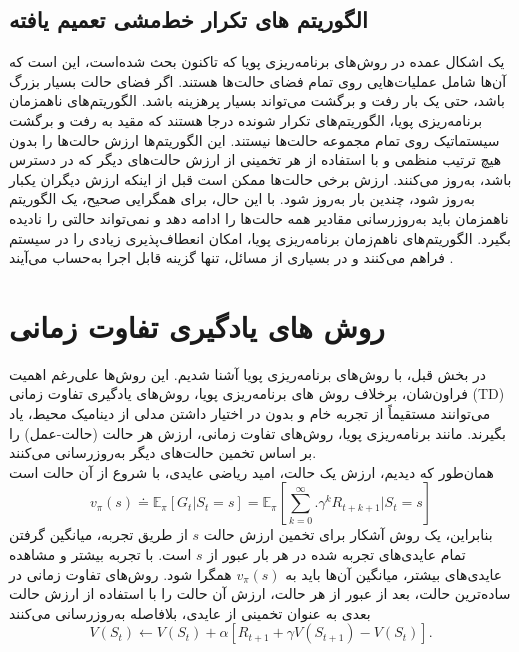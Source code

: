 \subsection{الگوریتم های تکرار خط‌مشی تعمیم یافته}
%
%
%
یک اشکال عمده در روش‌های برنامه‌ریزی پویا که تاکنون بحث شده‌است، این است که آن‌ها شامل عملیات‌هایی روی تمام فضای حالت‌ها هستند.
اگر فضای حالت بسیار بزرگ باشد،
حتی یک بار رفت و برگشت می‌تواند بسیار پرهزینه باشد.
الگوریتم‌های ناهمزمان برنامه‌ریزی پویا، الگوریتم‌های تکرار شونده درجا هستند که مقید به رفت و برگشت سیستماتیک روی تمام مجموعه حالت‌ها نیستند. این الگوریتم‌ها ارزش حالت‌ها را بدون هیچ ترتیب منظمی ‌و با استفاده از هر تخمینی از ارزش حالت‌های دیگر که در دسترس باشد، به‌روز می‌کنند.
 ارزش برخی حالت‌ها ممکن است قبل از اینکه ارزش دیگران یکبار به‌روز شود، چندین بار به‌روز شود. با این حال، برای همگرایی صحیح، یک الگوریتم ناهمزمان باید به‌روزرسانی مقادیر همه حالت‌ها را ادامه دهد و نمی‌تواند حالتی را نادیده بگیرد.
الگوریتم‌های ناهم‌زمان برنامه‌ریزی پویا، امکان انعطاف‌پذیری زیادی را در سیستم فراهم می‌کنند و در بسیاری از مسائل، تنها گزینه قابل اجرا به‌حساب می‌آیند 
\cite{suttonbook}.
\section{روش های یادگیری تفاوت زمانی}
در بخش قبل، با روش‌های برنامه‌ریزی پویا آشنا شدیم. این روش‌ها علی‌رغم اهمیت فراون‌شان،
برخلاف روش های برنامه‌ریزی پویا، روش‌های 
{یادگیری تفاوت زمانی} (TD) می‌توانند مستقیماً از تجربه خام و بدون در اختیار داشتن مدلی از دینامیک محیط، یاد بگیرند. مانند برنامه‌ریزی پویا، روش‌های تفاوت زمانی، ارزش‌ هر حالت (حالت-عمل) را بر اساس تخمین‌ حالت‌‌های دیگر به‌روزرسانی می‌کنند.
\\همان‌طور که دیدیم، ارزش یک حالت، امید ریاضی عایدی، با شروع از آن حالت است
$$v_\pi(s) \doteq \mathbb{E}_\pi\left[G_t| S_t=s\right] = \mathbb{E}_\pi\left[\sum_{k=0}^{\infty}. \gamma^k R_{t+k+1}|S_t =s \right]$$
بنابراین، یک روش آشکار برای تخمین ارزش حالت $s$ از طریق تجربه، میانگین گرفتن تمام عایدی‌های تجربه شده در هر بار عبور از $s$ است.
با تجربه بیشتر و مشاهده عایدی‌های بیشتر، میانگین آن‌ها باید به $v_\pi(s)$ همگرا شود.
روش‌های تفاوت زمانی در ساده‌ترین حالت، بعد از عبور از هر حالت، ارزش آن حالت را با استفاده از ارزش حالت بعدی به عنوان تخمینی از عایدی، بلافاصله به‌روزرسانی می‌کنند
$$V(S_t) \longleftarrow V(S_t) + \alpha\left[R_{t+1} + \gamma V(S_{t+1}) - V(S_t)\right].$$

